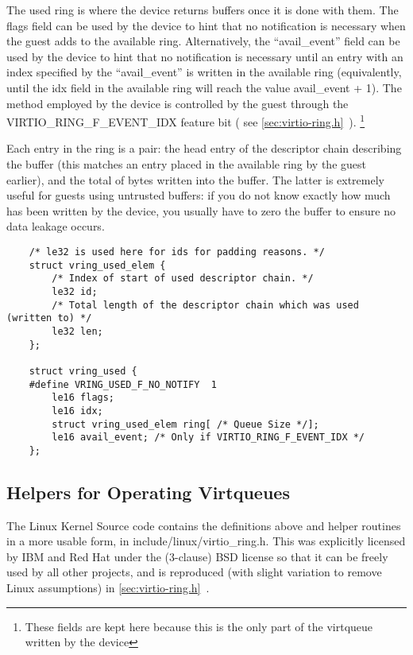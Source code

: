The used ring is where the device returns buffers once it is done
with them. The flags field can be used by the device to hint that
no notification is necessary when the guest adds to the available
ring. Alternatively, the “avail_event” field can be used by the
device to hint that no notification is necessary until an entry
with an index specified by the “avail_event” is written in the
available ring (equivalently, until the idx field in the
available ring will reach the value avail_event + 1). The method
employed by the device is controlled by the guest through the
VIRTIO_RING_F_EVENT_IDX feature bit (
see \ref{sec:virtio-ring.h}~).
\footnote{These fields are kept here because this is the only part of the
virtqueue written by the device
}

Each entry in the ring is a pair: the head entry of the
descriptor chain describing the buffer (this matches an entry
placed in the available ring by the guest earlier), and the total
of bytes written into the buffer. The latter is extremely useful
for guests using untrusted buffers: if you do not know exactly
how much has been written by the device, you usually have to zero
the buffer to ensure no data leakage occurs.

\begin{lstlisting}
	/* le32 is used here for ids for padding reasons. */
	struct vring_used_elem {
		/* Index of start of used descriptor chain. */
		le32 id;
		/* Total length of the descriptor chain which was used (written to) */
		le32 len;
	};

	struct vring_used {
	#define VRING_USED_F_NO_NOTIFY  1
		le16 flags;
		le16 idx;
		struct vring_used_elem ring[ /* Queue Size */];
		le16 avail_event; /* Only if VIRTIO_RING_F_EVENT_IDX */
	};
\end{lstlisting}

\subsection{Helpers for Operating Virtqueues}\label{sec:Basic Facilities of a Virtio Device / Virtqueues / Helpers for Operating Virtqueues}

The Linux Kernel Source code contains the definitions above and
helper routines in a more usable form, in
include/linux/virtio_ring.h. This was explicitly licensed by IBM
and Red Hat under the (3-clause) BSD license so that it can be
freely used by all other projects, and is reproduced (with slight
variation to remove Linux assumptions) in \ref{sec:virtio-ring.h}~.

